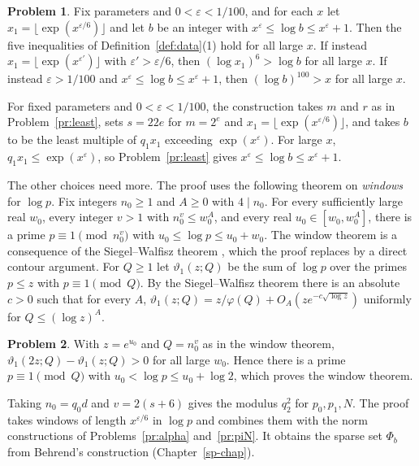 \documentclass[reqno]{amsart}
\newcounter{chap}
\theoremstyle{plain}
\theoremstyle{definition}
\newtheorem{problem}{Problem}[section]
\begin{document}
\begin{problem}\label{pr:eps}
Fix parameters and \(0 < \varepsilon < 1/100\), and for each \(x\) let \(x_1 = \lfloor \exp(x^{\varepsilon/6}) \rfloor\) and let \(b\) be an integer with \(x^\varepsilon \le \log b \le x^\varepsilon + 1\).  Then the five inequalities of Definition~\ref{def:data}(1) hold for all large \(x\).  If instead \(x_1 = \lfloor \exp(x^{\varepsilon'}) \rfloor\) with \(\varepsilon' > \varepsilon/6\), then \((\log x_1)^6 > \log b\) for all large \(x\).  If instead \(\varepsilon > 1/100\) and \(x^\varepsilon \le \log b \le x^\varepsilon + 1\), then \((\log b)^{100} > x\) for all large \(x\).
\end{problem}

For fixed parameters and \(0 < \varepsilon < 1/100\), the construction takes \(m\) and \(r\) as in Problem~\ref{pr:least}, sets \(s = 22e\) for \(m = 2^e\) and \(x_1 = \lfloor \exp(x^{\varepsilon/6}) \rfloor\), and takes \(b\) to be the least multiple of \(q_1 x_1\) exceeding \(\exp(x^\varepsilon)\).  For large \(x\), \(q_1 x_1 \le \exp(x^\varepsilon)\), so Problem~\ref{pr:least} gives \(x^\varepsilon \le \log b \le x^\varepsilon + 1\).

The other choices need more.  The proof uses the following theorem on \emph{windows} for \(\log p\).  Fix integers \(n_0 \ge 1\) and \(A \ge 0\) with \(4 \mid n_0\).  For every sufficiently large real \(w_0\), every integer \(v > 1\) with \(n_0^v \le w_0^A\), and every real \(u_0 \in [w_0, w_0^A]\), there is a prime \(p \equiv 1 \pmod{n_0^v}\) with \(u_0 \le \log p \le u_0 + w_0\).  The window theorem is a consequence of the Siegel--Walfisz theorem \cite{MV}, which the proof replaces by a direct contour argument.  For \(Q \ge 1\) let \(\vartheta_1(z; Q)\) be the sum of \(\log p\) over the primes \(p \le z\) with \(p \equiv 1 \pmod Q\).  By the Siegel--Walfisz theorem there is an absolute \(c > 0\) such that for every \(A\), \(\vartheta_1(z; Q) = z/\varphi(Q) + O_A(z e^{-c\sqrt{\log z}})\) uniformly for \(Q \le (\log z)^A\).

\begin{problem}\label{pr:window}
With \(z = e^{u_0}\) and \(Q = n_0^v\) as in the window theorem, \(\vartheta_1(2z; Q) - \vartheta_1(z; Q) > 0\) for all large \(w_0\).  Hence there is a prime \(p \equiv 1 \pmod Q\) with \(u_0 < \log p \le u_0 + \log 2\), which proves the window theorem.
\end{problem}

Taking \(n_0 = q_0 d\) and \(v = 2(s + 6)\) gives the modulus \(q_2^2\) for \(p_0, p_1, N\).  The proof takes windows of length \(x^{\varepsilon/6}\) in \(\log p\) and combines them with the norm constructions of Problems~\ref{pr:alpha} and~\ref{pr:piN}.  It obtains the sparse set \(\Phi_b\) from Behrend's construction (Chapter~\ref{sp-chap}).
\end{document}
